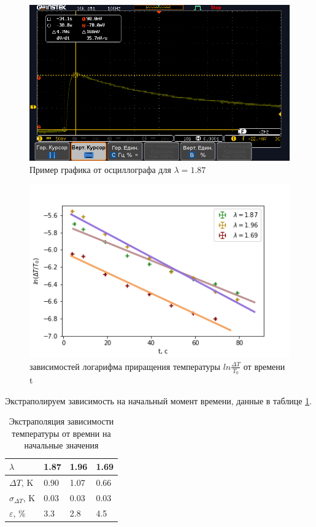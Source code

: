 \documentclass[a4paper,12pt]{article} %
\begin{document}
\begin{figure}[h!]
\begin{center}
\includegraphics[width=\textwidth]{DS0002}
\end{center}
\caption{Пример графика от осциллографа для $\lambda = 1.87$} \label{осциллограф}
\end{figure}

\begin{figure}[h!]
\begin{center}
\includegraphics[width=\textwidth]{T(t)}
\end{center}
\caption{зависимостей логарифма приращения температуры $ln \frac{\Delta T}{T_0}$
от времени t} \label{T(t)}
\end{figure}

Экстраполируем зависимость на начальный момент времени, данные в таблице \ref{экстраполяция}.

\begin{table}[h!]
\caption{Экстраполяция зависимости температуры от времни на начальные значения}
\label{экстраполяция}
\begin{tabular}{|l|l|l|l|}
\hline
$\lambda$              & 1.87 & 1.96 & 1.69 \\ \hline
$\Delta T$, K          & 0.90 & 1.07 & 0.66 \\ \hline
$\sigma_{\Delta T}$, K & 0.03 & 0.03 & 0.03 \\ \hline
$\varepsilon$, \%      & 3.3  & 2.8  & 4.5  \\ \hline
\end{tabular}
\end{table}
\end{document}

